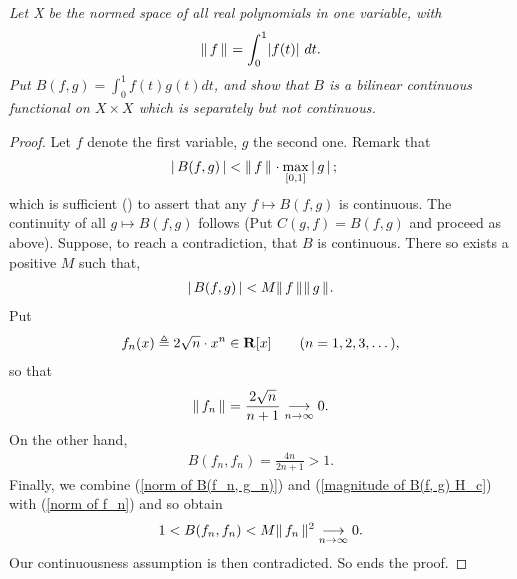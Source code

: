 \textit{%
Let X be the normed space of all real polynomials in one variable, with %
%
  \begin{align*}
    \| \,f \, \|_{}=\int_0^1\lvert f(t)\rvert\ dt.
\end{align*}
%
Put  %
  $B(f, g)=\int _0^1 f(t)g(t) dt $, %
%
and show that $B$ is a bilinear continuous functional on $X\times X$ %
which is separately but not continuous.
}
\begin{proof} Let $f$ denote the first variable, $g$ the second one. %
Remark that %
%
  \begin{align}\label{magnitude of B(f, g)}
    \left\lvert\, B(f, g) \,\right\rvert 
      & < \| \,f \, \|_{} \cdot \max_{[0,1]} \left\lvert\, g \,\right\rvert ; 
  \end{align}
%
which is sufficient () to assert that any %
%
  $f \mapsto B(f, g)$ 
%
is continuous. The continuity of all %
%
  $g \mapsto B(f,g)$ %
%
follows (Put $C(g, f) = B(f, g)$ and proceed as above). %
Suppose, to reach a contradiction, that $B$ is continuous. %
There so exists a positive $M$ such that, 
%
  \begin{align}\label{magnitude of B(f, g) H_c}
    \left\lvert\, B(f, g) \,\right\rvert < M \| \,f \, \|_{}\| \,g \, \|_{}.
  \end{align}
%
Put %
%
  \begin{align}\label{definition of f_n}
    f_n(x)\triangleq 2 \sqrt{n}\cdot x^{n}\in {\mathbf R}[x] \quad\quad (n=1, 2, 3, \dots), 
  \end{align}
%
so that 
%
  \begin{align}\label{norm of f_n}
    \| \,f_n \, \|_{} = \frac{2 \sqrt{n}}{n+1} \underset{n\to \infty}{\longrightarrow}0.
  \end{align}
%
On the other hand,
%
  \begin{align}\label{norm of B(f_n, g_n)}
    B(f_n, f_n)= \frac{4 n}{2n+1} > 1.
  \end{align}
%
Finally, we combine %
%
  (\ref{norm of B(f_n, g_n)}) and %
  (\ref{magnitude of B(f, g) H_c}) with %
  (\ref{norm of f_n}) %
%
and so obtain
\begin{align}
 1 < B(f_n, f_n) <  M \| \,f_n \, \|_{}^2  \underset{n\to \infty}{\longrightarrow} 0.
\end{align}
Our continuousness assumption is then contradicted. So ends the proof.
\end{proof}
